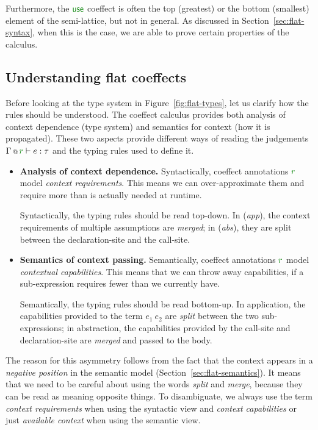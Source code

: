 Furthermore, the $\cunit$ coeffect is often the top (greatest) or the bottom (smallest) 
element of the semi-lattice, but not in general. As discussed in Section~\ref{sec:flat-syntax},
when this is the case, we are able to prove certain properties of the calculus.


\subsection{Understanding flat coeffects}

Before looking at the type system in Figure~\ref{fig:flat-types}, let us clarify how the rules
should be understood. The coeffect calculus provides both analysis of context dependence (type 
system) and semantics for context (how it is propagated). These two aspects provide different
ways of reading the judgements $\coctx{\Gamma}{\cclrd{r}} \vdash e : \tau$ and the typing rules
used to define it.

\begin{itemize}
\item \textbf{Analysis of context dependence.}
Syntactically, coeffect annotations $\cclrd{r}$ model \emph{context requirements}. This means
we can over-approximate them and require more than is actually needed at runtime. 

Syntactically, the typing rules should be read top-down. In (\emph{app}), the context requirements 
of multiple assumptions are \emph{merged}; in (\emph{abs}), they are split between the declaration-site
and the call-site.

\item \textbf{Semantics of context passing.}
Semantically, coeffect annotations $\cclrd{r}$ mo\-del \emph{contextual capabilities}. This means
that we can throw away capabilities, if a sub-expression requires fewer than we 
currently have.

Semantically, the typing rules should be read bottom-up. In application, the capabilities 
provided to the term $e_1~e_2$ are \emph{split} between the two sub-expressions; in abstraction,
the capabilities provided by the call-site and declaration-site are \emph{merged} and passed
to the body.
\end{itemize}

The reason for this asymmetry follows from the fact that the context appears in a \emph{negative
position} in the semantic model (Section~\ref{sec:flat-semantics}). It means that we need to be
careful about using the words \emph{split} and \emph{merge}, because they can be read as meaning
opposite things. To disambiguate, we always use the term \emph{context requirements} when using
the syntactic view and \emph{context capabilities} or just \emph{available context} when using 
the semantic view.

